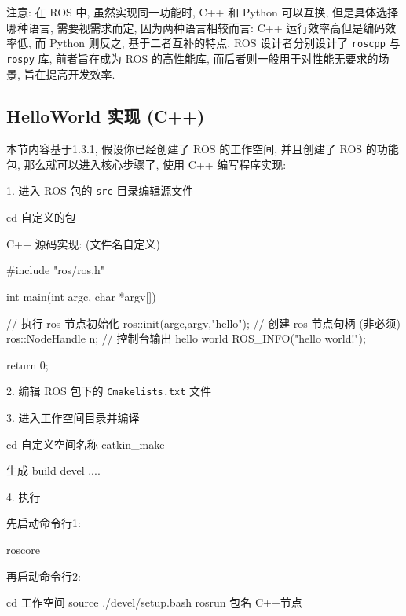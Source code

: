 \documentclass[openany, fontset=windowsold]{ctexbook}
\theoremstyle{kaiti}
\theoremstyle{normal}
\begin{document}
注意: 在 ROS 中, 虽然实现同一功能时, C++ 和 Python 可以互换, 但是具体选择哪种语言, 需要视需求而定, 因为两种语言相较而言: C++ 运行效率高但是编码效率低, 而 Python 则反之, 基于二者互补的特点, ROS 设计者分别设计了 \verb|roscpp| 与 \verb|rospy| 库, 前者旨在成为 ROS 的高性能库, 而后者则一般用于对性能无要求的场景, 旨在提高开发效率.

\subsection{HelloWorld 实现 (C++)}

本节内容基于1.3.1, 假设你已经创建了 ROS 的工作空间, 并且创建了 ROS 的功能包, 那么就可以进入核心步骤了, 使用 C++ 编写程序实现: 

1. 进入 ROS 包的 \verb|src| 目录编辑源文件

\begin{bash}
  cd 自定义的包
\end{bash}

C++ 源码实现: (文件名自定义)

\begin{cpp}
  #include "ros/ros.h"

  int main(int argc, char *argv[])
  {
      // 执行 ros 节点初始化
      ros::init(argc,argv,"hello");
      // 创建 ros 节点句柄 (非必须)
      ros::NodeHandle n;
      // 控制台输出 hello world
      ROS_INFO("hello world!");

      return 0;
  }
\end{cpp}

2. 编辑 ROS 包下的 \verb|Cmakelists.txt| 文件


3. 进入工作空间目录并编译

\begin{bash}
  cd 自定义空间名称
  catkin_make
\end{bash}

生成 build devel ....

4. 执行

先启动命令行1: 

\begin{bash}
  roscore
\end{bash}

再启动命令行2: 

\begin{bash}
  cd 工作空间
  source ./devel/setup.bash
  rosrun 包名 C++节点
\end{bash}
\end{document}
